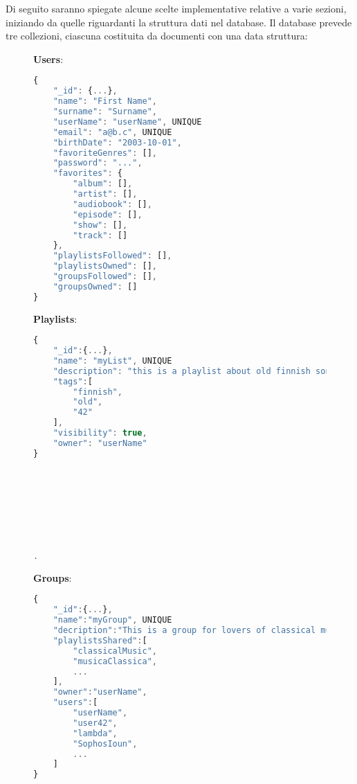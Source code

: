 Di seguito saranno spiegate alcune scelte implementative relative a varie sezioni, iniziando da quelle riguardanti la struttura dati nel database.
Il database prevede tre collezioni, ciascuna costituita da documenti con una data struttura:

\begin{figure}[h]
    \begin{minipage}{.30\textwidth}
        \textbf{Users}:

        \begin{lstlisting}[language=JavaScript]
{
    "_id": {...},
    "name": "First Name",
    "surname": "Surname",
    "userName": "userName", UNIQUE
    "email": "a@b.c", UNIQUE
    "birthDate": "2003-10-01",
    "favoriteGenres": [],
    "password": "...",
    "favorites": {
        "album": [],
        "artist": [],
        "audiobook": [],
        "episode": [],
        "show": [],
        "track": []
    },
    "playlistsFollowed": [],
    "playlistsOwned": [],
    "groupsFollowed": [],
    "groupsOwned": []
}
        \end{lstlisting}
    \end{minipage}
    \hfill
    \begin{minipage}{.30\textwidth}
        \textbf{Playlists}:

        \begin{lstlisting}[language=JavaScript]
{
    "_id":{...},
    "name": "myList", UNIQUE
    "description": "this is a playlist about old finnish songs",
    "tags":[
        "finnish",
        "old",
        "42"
    ],
    "visibility": true,
    "owner": "userName"
}








.
        \end{lstlisting}
    \end{minipage}
    \hfill
    \begin{minipage}{.30\textwidth}
        \textbf{Groups}:

        \begin{lstlisting}[language=JavaScript]
{
    "_id":{...},
    "name":"myGroup", UNIQUE
    "decription":"This is a group for lovers of classical music. Join this group to gain access to more than 15 playlists!",
    "playlistsShared":[
        "classicalMusic",
        "musicaClassica",
        ...
    ],
    "owner":"userName",
    "users":[
        "userName",
        "user42",
        "lambda",
        "SophosIoun",
        ...
    ]
}

        \end{lstlisting}
    \end{minipage}
\end{figure}
